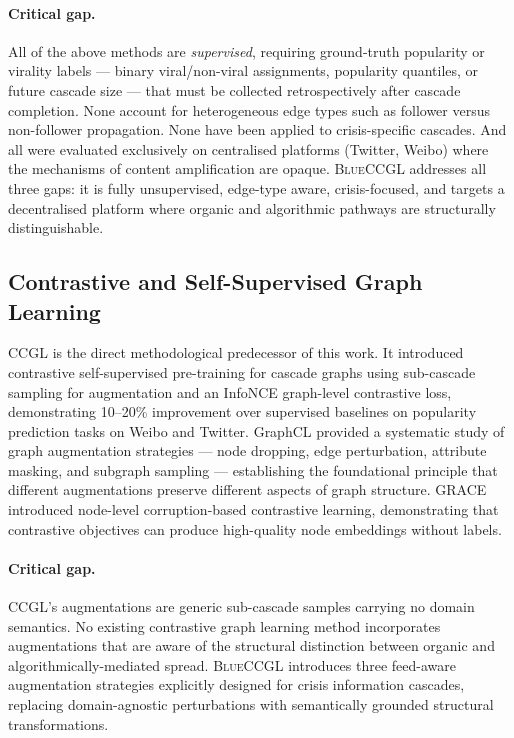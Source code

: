 \documentclass[12pt, a4paper]{article}
\newcommand{\BLUECCGL}{\textsc{BlueCCGL}\xspace}
\begin{document}
\paragraph{Critical gap.} All of the above methods are \textit{supervised}, requiring ground-truth popularity or virality labels --- binary viral/non-viral assignments, popularity quantiles, or future cascade size --- that must be collected retrospectively after cascade completion. None account for heterogeneous edge types such as follower versus non-follower propagation. None have been applied to crisis-specific cascades. And all were evaluated exclusively on centralised platforms (Twitter, Weibo) where the mechanisms of content amplification are opaque. \BLUECCGL addresses all three gaps: it is fully unsupervised, edge-type aware, crisis-focused, and targets a decentralised platform where organic and algorithmic pathways are structurally distinguishable.

\subsection{Contrastive and Self-Supervised Graph Learning}

CCGL \citep{xu2022ccgl} is the direct methodological predecessor of this work. It introduced contrastive self-supervised pre-training for cascade graphs using sub-cascade sampling for augmentation and an InfoNCE graph-level contrastive loss, demonstrating 10--20\% improvement over supervised baselines on popularity prediction tasks on Weibo and Twitter. GraphCL \citep{you2020graphcl} provided a systematic study of graph augmentation strategies --- node dropping, edge perturbation, attribute masking, and subgraph sampling --- establishing the foundational principle that different augmentations preserve different aspects of graph structure. GRACE \citep{zhu2020grace} introduced node-level corruption-based contrastive learning, demonstrating that contrastive objectives can produce high-quality node embeddings without labels.

\paragraph{Critical gap.} CCGL's augmentations are generic sub-cascade samples carrying no domain semantics. No existing contrastive graph learning method incorporates augmentations that are aware of the structural distinction between organic and algorithmically-mediated spread. \BLUECCGL introduces three feed-aware augmentation strategies explicitly designed for crisis information cascades, replacing domain-agnostic perturbations with semantically grounded structural transformations.
\end{document}
